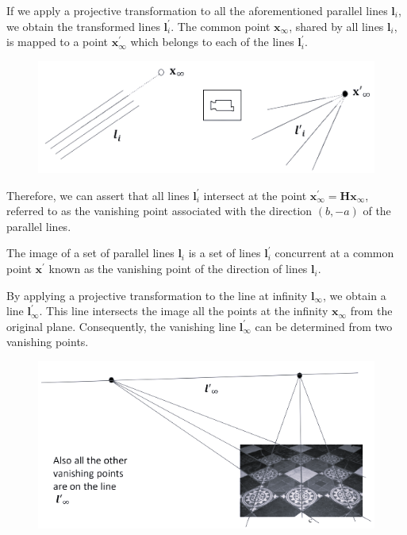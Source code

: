 If we apply a projective transformation to all the aforementioned parallel lines $\mathbf{l}_i$, we obtain the transformed lines $\mathbf{l}_i^\prime$. 
The common point $\mathbf{x}_{\infty}$, shared by all lines $\mathbf{l}_i$, is mapped to a point $\mathbf{x}_{\infty}^\prime$ which belongs to each of the lines $\mathbf{l}_i^\prime$. 
\begin{figure}[H]
    \centering
    \includegraphics[width=0.5\linewidth]{images/vanishing.png}
\end{figure}
Therefore, we can assert that all lines $\mathbf{l}_i^\prime$ intersect at the point $\mathbf{x}_{\infty}^\prime=\mathbf{Hx}_{\infty}$, referred to as the vanishing point associated with the direction $(b,-a)$ of the parallel lines. 
\begin{theorem}
    The image of a set of parallel lines $\mathbf{l}_i$ is a set of lines $\mathbf{l}_i^\prime$ concurrent at a common point $\mathbf{x}^\prime$ known as the vanishing point of the direction of lines $\mathbf{l}_i$. 
\end{theorem}

By applying a projective transformation to the line at infinity $\mathbf{l}_{\infty}$, we obtain a line $\mathbf{l}_{\infty}^\prime$. 
This line intersects the image all the points at the infinity $\mathbf{x}_{\infty}$ from  the original plane. 
Consequently, the vanishing line $\mathbf{l}_{\infty}^\prime$ can be determined from two vanishing points. 
\begin{figure}[H]
    \centering
    \includegraphics[width=0.5\linewidth]{images/vanishingline.png}
\end{figure}

